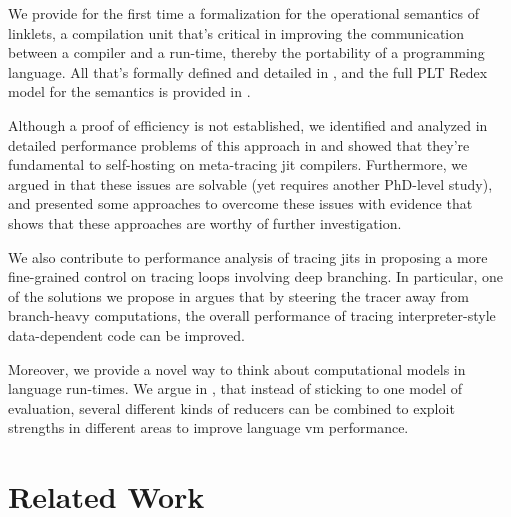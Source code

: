     \begin{paragraph-here}%
        We provide for the first time a formalization for the operational semantics of linklets, a compilation unit that's critical in improving the communication between a compiler and a run-time, thereby the portability of a programming language. All that's formally defined and detailed in , and the full PLT Redex model for the semantics is provided in . %
    \end{paragraph-here}

    \begin{paragraph-here}%
        Although a proof of efficiency is not established, we identified and analyzed in detailed performance problems of this approach in  and showed that they're fundamental to self-hosting on meta-tracing \gls{jit} compilers. Furthermore, we argued in  that these issues are solvable (yet requires another PhD-level study), and presented some approaches to overcome these issues with evidence that shows that these approaches are worthy of further investigation.  %
    \end{paragraph-here}

    \begin{paragraph-here}%
        We also contribute to performance analysis of tracing \glspl{jit} in proposing a more fine-grained control on tracing loops involving deep branching. In particular, one of the solutions we propose in  argues that by steering the tracer away from branch-heavy computations, the overall performance of tracing interpreter-style data-dependent code can be improved.
    \end{paragraph-here}

    \begin{paragraph-here}%
        Moreover, we provide a novel way to think about computational models in language run-times. We argue in , that instead of sticking to one model of evaluation, several different kinds of reducers can be combined to exploit strengths in different areas to improve language \gls{vm} performance. %
    \end{paragraph-here}

    \section{Related Work}
        \label{section:related-work}

